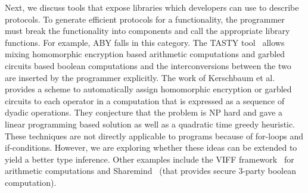 Next, we discuss tools that expose libraries which  developers can use to describe \mpc protocols. 
To generate efficient protocols for a functionality, the programmer must break the functionality into components and call the appropriate library functions. For example,  ABY \cite{aby} falls in this category. The TASTY tool~\cite{tasty} allows mixing homomorphic encryption based arithmetic computations 
and garbled circuits based boolean computations and the interconversions between the two are inserted by the programmer explicitly.
The work of Kerschbaum et al.~\cite{autoS} provides a scheme to automatically assign homomorphic encryption or garbled circuits to each operator in a computation that is expressed as a sequence of dyadic operations. They conjecture that the problem is NP hard and gave a linear programming based solution as well as a quadratic time greedy heuristic. 
These techniques are not directly applicable to \tool programs because of for-loops and if-conditions.
However, we are exploring whether these ideas can be extended to yield a better type inference.
Other examples include the VIFF framework~\cite{viff} for arithmetic computations and Sharemind~\cite{sharemind} (that provides secure 3-party boolean computation). 

